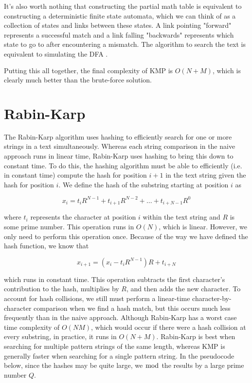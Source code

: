 \documentclass[11pt]{article}
\begin{document}
It's also worth nothing that constructing the partial math table is equivalent to constructing a deterministic finite state automata, which we can think of as a collection of states and links between these states. A link pointing "forward" represents a successful match and a link falling "backwards" represents which state to go to after encountering a mismatch. The algorithm to search the text is equivalent to simulating the DFA . 

Putting this all together, the final complexity of KMP is $O(N+M)$, which is clearly much better than the brute-force solution. 


\section{Rabin-Karp}
The Rabin-Karp algorithm uses hashing to efficiently search for one or more strings in a text simultaneously. Whereas each string comparison in the naive approach runs in linear time, Rabin-Karp uses hashing to bring this down to constant time. To do this, the hashing algorithm must be able to efficiently (i.e. in constant time) compute the hash for position $i+1$ in the text string given the hash for position $i$. We define the hash of the substring starting at position $i$ as

$$x_i = t_{i}R^{N-1} + t_{i+1}R^{N-2} + \ldots + t_{i+N-1}R^0$$

\noindent where $t_i$ represents the character at position $i$ within the text string and $R$ is some prime number. This operation runs in $O(N)$, which is linear. However, we only need to perform this operation once. Because of the way we have defined the hash function, we know that

$$x_{i+1} = (x_i - t_{i}R^{N-1})R + t_{i+N}$$

\noindent which runs in constant time. This operation subtracts the first character's contribution to the hash, multiplies by $R$, and then adds the new character. To account for hash collisions, we still must perform a linear-time character-by-character comparison when we find a hash match, but this occurs much less frequently than in the naive approach. Although Rabin-Karp has a worst case time complexity of $O(NM)$, which would occur if there were a hash collision at every substring, in practice, it runs in $O(N+M)$. Rabin-Karp is best when searching for multiple pattern strings of the same length, whereas KMP is generally faster when searching for a single pattern string. In the pseudocode below, since the hashes may be quite large, we $\bmod$ the results by a large prime number $Q$. 
\end{document}
